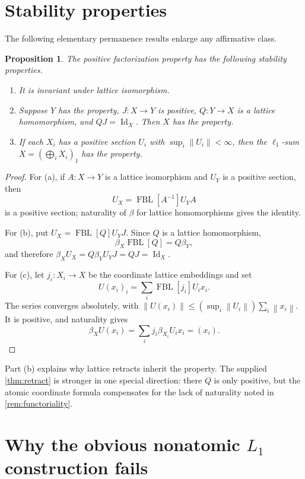 \documentclass[11pt]{article}
\newtheorem{proposition}[theorem]{Proposition}
\newcommand{\FBL}{\operatorname{FBL}}
\newcommand{\Id}{\operatorname{Id}}
\newcommand{\norm}[1]{\left\lVert #1\right\rVert}
\begin{document}
\section{Stability properties}

The following elementary permanence results enlarge any affirmative class.

\begin{proposition}\label{prop:stability}
The positive factorization property has the following stability properties.
\begin{enumerate}[label=(\alph*),leftmargin=2.2em]
\item It is invariant under lattice isomorphism.
\item Suppose $Y$ has the property, $J:X\to Y$ is positive,
$Q:Y\to X$ is a lattice homomorphism, and $QJ=\Id_X$.  Then $X$ has the
property.
\item If each $X_i$ has a positive section $U_i$ with
$\sup_i\norm{U_i}<\infty$, then the $\ell_1$-sum
$X=(\bigoplus_i X_i)_1$ has the property.
\end{enumerate}
\end{proposition}

\begin{proof}
For (a), if $A:X\to Y$ is a lattice isomorphism and $U_Y$ is a positive
section, then
\[
 U_X=\FBL[A^{-1}]U_YA
\]
is a positive section; naturality of $\beta$ for lattice homomorphisms gives
the identity.

For (b), put $U_X=\FBL[Q]U_YJ$.  Since $Q$ is a lattice homomorphism,
\[
 \beta_X\FBL[Q]=Q\beta_Y,
\]
and therefore $\beta_XU_X=Q\beta_YU_YJ=QJ=\Id_X$.

For (c), let $j_i:X_i\to X$ be the coordinate lattice embeddings and set
\[
 U(x_i)_i=\sum_i \FBL[j_i]U_ix_i.
\]
The series converges absolutely, with
$\norm{U(x_i)}\leq (\sup_i\norm{U_i})\sum_i\norm{x_i}$.  It is positive, and
naturality gives
\[
 \beta_XU(x_i)=\sum_i j_i\beta_{X_i}U_ix_i=(x_i).
\]
\end{proof}

Part (b) explains why lattice retracts inherit the property.  The supplied
\cref{thm:retract} is stronger in one special direction: there $Q$ is only
positive, but the atomic coordinate formula compensates for the lack of
naturality noted in \cref{rem:functoriality}.

\section{Why the obvious nonatomic $L_1$ construction fails}
\end{document}
